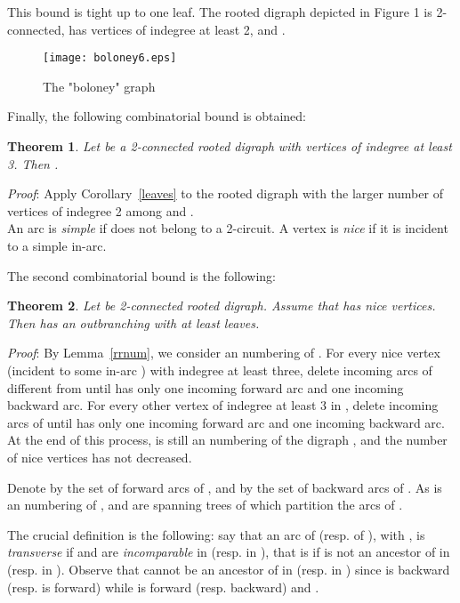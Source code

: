 \documentclass{article}
\newtheorem{theorem}{Theorem}
\begin{document}
This bound is tight up to one leaf. The rooted digraph  depicted in Figure 1 is 2-connected, has  vertices of indegree at least 2,  and .


\vspace{12pt}

\begin{figure}
\centering
\texttt{[image: boloney6.eps]}
\caption{The "boloney" graph }
\end{figure}

Finally, the following combinatorial bound is obtained:

\begin{theorem}\label{bound1}
Let  be a 2-connected rooted digraph with  vertices of indegree at least 3. Then  .
\end{theorem}
\emph{Proof}: Apply Corollary~\ref{leaves} to the rooted digraph with the larger number of vertices of indegree 2 among  and . \\



An arc is \emph{simple} if does not belong to a 2-circuit. A vertex 
is \emph{nice} if it is incident
to a simple in-arc. 

The second combinatorial bound is the following:
\begin{theorem}\label{bound2}
Let  be 2-connected rooted digraph. Assume that  has  nice vertices. Then  has an outbranching with at least  leaves.
\end{theorem}
\emph{Proof}:
By Lemma~\ref{rrnum}, we consider an  numbering  of .
For every nice vertex 
(incident
to some in-arc ) with indegree at least three, delete incoming arcs
of  different from  until  has only one incoming forward arc
and one incoming backward arc. For every other vertex of indegree at
least 3 in , delete incoming arcs of  until  has only one
incoming forward arc and one incoming backward arc. At the end of this
process,  is still an  numbering of the digraph , and
the number of nice vertices has not decreased.

Denote by  the set of forward arcs of , and by  the set of
backward arcs of . As  is an  numbering of , 
and  are spanning trees of  which partition the arcs of .

The crucial definition is the following: say that an arc  of 
(resp. of ), with , is \emph{transverse} if  and 
are \emph{incomparable} in  (resp. in ), that is if  is not
an ancestor of  in  (resp. in ). Observe that  cannot be
an ancestor of  in  (resp. in ) since  is backward (resp.  is forward) while 
is forward (resp. backward) and .
\end{document}
